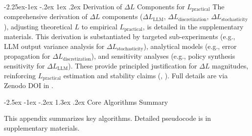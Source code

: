 \documentclass[manuscript,screen,review,anonymous,9pt]{acmart}
\makeatletter
\renewcommand\section{\@startsection{section}{1}{\z@}%
  {-2.5ex \@plus -1ex \@minus -.2ex}%
  {1.3ex \@plus.2ex}%
  {\normalfont\Large\bfseries}}
\renewcommand\subsection{\@startsection{subsection}{2}{\z@}%
  {-2.25ex\@plus -1ex \@minus -.2ex}%
  {1ex \@plus .2ex}%
  {\normalfont\large\bfseries}}
\makeatother
\begin{document}
\subsection{Derivation of \texorpdfstring{$\Delta L$}{Delta L} Components for \texorpdfstring{$L_{\text{practical}}$}{L\_practical}}
\label{app:delta_L_derivation}
The comprehensive derivation of $\Delta L$ components ($\Delta L_{\text{LLM}}$, $\Delta L_{\text{discretization}}$, $\Delta L_{\text{stochasticity}}$), adjusting theoretical $L$ to empirical $L_{\text{practical}}$, is detailed in the supplementary materials. This derivation is substantiated by targeted sub-experiments (e.g., LLM output variance analysis for $\Delta L_{\text{stochasticity}}$), analytical models (e.g., error propagation for $\Delta L_{\text{discretization}}$), and sensitivity analyses (e.g., policy synthesis sensitivity for $\Delta L_{\text{LLM}}$). These provide principled justification for $\Delta L$ magnitudes, reinforcing $L_{\text{practical}}$ estimation and stability claims (, ). Full details are via Zenodo DOI in .

\section{Core Algorithms Summary}
\label{app:algorithms}

This appendix summarizes key algorithms. Detailed pseudocode is in supplementary materials.
\end{document}

